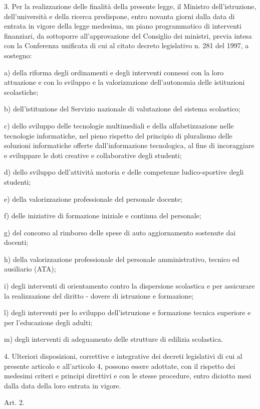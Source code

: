 3. Per la realizzazione delle finalità della presente legge, il Ministro dell'istruzione, dell'università e della ricerca predispone, entro novanta giorni dalla data di entrata in vigore della legge medesima, un piano programmatico di interventi finanziari, da sottoporre all'approvazione del Consiglio dei ministri, previa intesa con la Conferenza unificata di cui al citato decreto legislativo n. 281 del 1997, a sostegno:

a) della riforma degli ordinamenti e degli interventi connessi con la loro attuazione e con lo sviluppo e la valorizzazione dell'autonomia delle istituzioni scolastiche;

b) dell'istituzione del Servizio nazionale di valutazione del sistema scolastico;

c) dello sviluppo delle tecnologie multimediali e della alfabetizzazione nelle tecnologie informatiche, nel pieno rispetto del principio di pluralismo delle soluzioni informatiche offerte dall'informazione tecnologica, al fine di incoraggiare e sviluppare le doti creative e collaborative degli studenti;

d) dello sviluppo dell'attività motoria e delle competenze ludico-sportive degli studenti;

e) della valorizzazione professionale del personale docente;

f) delle iniziative di formazione iniziale e continua del personale;

g) del concorso al rimborso delle spese di auto aggiornamento sostenute dai docenti;

h) della valorizzazione professionale del personale amministrativo, tecnico ed ausiliario (ATA);

i) degli interventi di orientamento contro la dispersione scolastica e per assicurare la realizzazione del diritto - dovere di istruzione e formazione;

l) degli interventi per lo sviluppo dell'istruzione e formazione tecnica superiore e per l'educazione degli adulti;

m) degli interventi di adeguamento delle strutture di edilizia scolastica.

4. Ulteriori disposizioni, correttive e integrative dei decreti legislativi di cui al presente articolo e all'articolo 4, possono essere adottate, con il rispetto dei medesimi criteri e principi direttivi e con le stesse procedure, entro diciotto mesi dalla data della loro entrata in vigore.

Art. 2.

